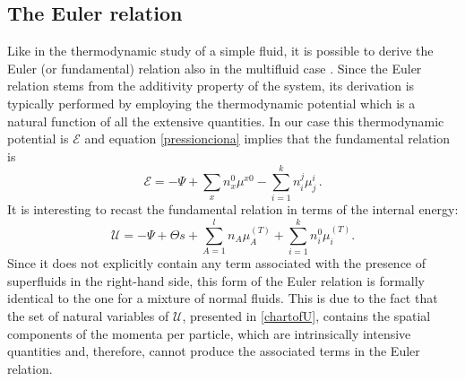 \documentclass[usenatbib]{mnras}
\begin{document}
\subsection{The Euler relation}

Like in the thermodynamic study of a simple fluid, it is possible to derive the Euler (or fundamental) relation also in the multifluid case \citep[see e.g. the discussion in ][]{andersson2007review}. Since the Euler relation stems from the additivity property of the system, its derivation is typically performed by employing the thermodynamic potential which is a natural function of all the extensive quantities. 
In our case this thermodynamic potential is $\mathcal{E}$ and equation \eqref{pressionciona} implies that the fundamental relation is
%
\begin{equation}
\label{zerbino}
\mathcal{E} = -\Psi + \sum_x n_x^0 \mu^{x0} - \sum_{i=1}^k n_{i}^j\mu_{ j}^i \, .
\end{equation}
%
It is interesting to recast the fundamental relation in terms of the internal energy:
%
\begin{equation}
\label{euler2}
\mathcal{U} = -\Psi + \Theta s + \sum_{A=1}^l n_{A} \mu_{A}^{(T)} + \sum_{i=1}^k n_{i}^0 \mu_{i}^{(T)}.  
\end{equation}
%
Since it does not explicitly contain any term  associated with the presence of superfluids in the right-hand side, this form of the Euler relation is formally identical to the one for a mixture of normal fluids. This is due to the fact that the set of natural variables of $\mathcal{U}$, presented in \eqref{chartofU}, contains the spatial components of the momenta per particle, which are intrinsically intensive quantities and, therefore, cannot produce the associated terms in the Euler relation.
\end{document}
